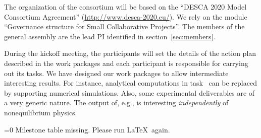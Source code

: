 
The organization of the consortium will be based on the ``DESCA 2020 Model Consortium
Agreement'' (\url{http://www.desca-2020.eu/}). We rely on the module ``Governance structure
for Small Collaborative Projects''.
%
The members of the general assembly are the lead PI identified in section~\ref{sec:members}.

During the kickoff meeting, the participants will set the details of the action plan
described in the work packages and each participant is responsible for carrying out its
tasks.
%
We have designed our work packages to allow intermediate interesting results. For instance,
analytical computations in task~ can be replaced by
supporting numerical simulations.
%
Also, some experimental deliverables are of a very generic nature. The output of, e.g.,
 is interesting {\em independently} of nonequilibrium
physics.

\makeatletter
\ifnum{}=0
Milestone table missing. Please run \LaTeX\ again.%
\else%
\milestonetable%
\fi
\makeatother
